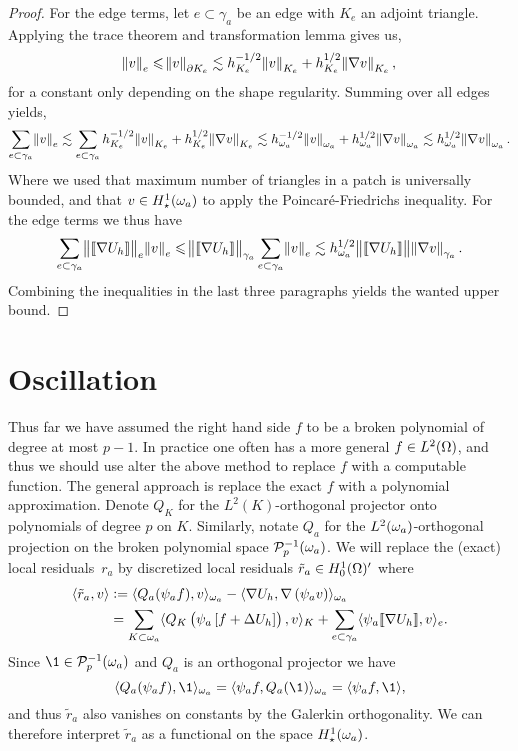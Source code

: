 \documentclass[thesis.tex]{subfiles}
\begin{document}
\begin{proof}
  For the edge terms, let $e \subset \gamma_a$ be an edge with $K_e$ an adjoint triangle. Applying the trace theorem and transformation lemma
  gives us,
  \[ 
    \norm{v}_e \leqslant \norm{v}_{\partial K_e} \lesssim h_{K_e}^{-1/2} \norm{v}_{K_e} + h_{K_e}^{1/2} \norm{\nabla v}_{K_e},
  \]
  for a constant only depending on the shape regularity. 
  Summing over all edges yields,
  \[
    \sum_{e \subset \gamma_a} \norm{v}_e \lesssim \sum_{e\subset \gamma_a}h_{K_e}^{-1/2} \norm{v}_{K_e} +  h_{K_e}^{1/2} \norm{\nabla v}_{K_e}
    \lesssim h_{\omega_a}^{-1/2} \norm{v}_{\omega_a} + h_{\omega_a}^{1/2} \norm{\nabla v}_{\omega_a} \lesssim h_{\omega_a}^{1/2} \norm{\nabla v}_{\omega_a}.
  \]
  Where we used that maximum number of triangles in a patch is universally bounded, and that $v \in H_\star^1(\omega_a)$ to apply the
  Poincar\'e-Friedrichs inequality. For the edge terms we thus have
  \[
    \sum_{e \subset \gamma_a} \norm{ \llbracket \nabla U_h \rrbracket}_e \norm{v}_e \leqslant \norm{\llbracket \nabla U_h \rrbracket}_{\gamma_a} \sum_{e \subset \gamma_a} \norm{v}_e \lesssim h_{\omega_a}^{1/2} \norm{\llbracket \nabla U_h \rrbracket}  \norm{\nabla v}_{\gamma_a}. 
  \]
  Combining the inequalities in the last three paragraphs yields the wanted upper bound.
\end{proof}
\section{Oscillation}
Thus far we have assumed the right hand side $f$ to be a broken polynomial of degree at most $p-1$. In practice one 
often has a more general $f \in L^2(\Omega)$, and thus we should use alter the above method to replace $f$ with a computable function.
The general approach is replace the exact $f$ with a polynomial approximation. 
Denote $Q_K$ for the $L^2(K)$-orthogonal projector onto polynomials of degree $p$ on $K$.
Similarly, notate $Q_a$ for the $L^2(\omega_a)$-orthogonal projection on the broken polynomial space $\mathcal{P}_p^{-1}(\omega_a)$.
We will replace the (exact) local residuals~$r_a$ by discretized local residuals  $\tilde r_a  \in H_0^1(\Omega)'$ where 
\begin{align*}
  \langle \tilde r_a, v \rangle &:= \langle Q_a(\psi_af),v \rangle_{\omega_a} - \langle \nabla U_h, \nabla \left(\psi_a v\right) \rangle_{\omega_a} \\
   &= \sum_{K \subset \omega_a} \langle Q_K \left(\psi_a \left[f + \Delta U_h\right]\right), v \rangle_K 
  +\sum_{e \subset \gamma_a} \langle \psi_a \llbracket \nabla U_h\rrbracket, v \rangle_e.
\end{align*}
Since $\1 \in \P_p^{-1}(\w_a)$ and $Q_a$ is an orthogonal projector we have 
\[
  \ip{Q_a(\psi_a f), \1}_{\w_a} = \ip{\psi_a f, Q_a(\1)}_{\w_a} = \ip{\psi_a f, \1},
\]
and thus $\tilde r_a$ also vanishes on constants by the Galerkin orthogonality. We can therefore interpret $\tilde r_a$ as a functional on the space  $H_\star^1(\omega_a)$.
\end{document}
